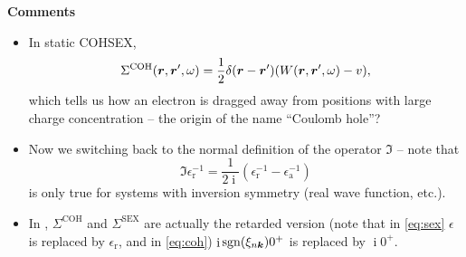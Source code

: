 \documentclass[t]{beamer}
\DeclareMathOperator{\ii}{i}
\DeclareMathOperator{\sgn}{sgn}
\begin{document}
\begin{frame}[allowframebreaks]
\textbf{Comments} \begin{itemize}
    \item In static COHSEX,  
        \begin{equation}
            \Sigma^{\text{COH}}(\vb*{r}, \vb*{r}', \omega)
            = \frac{1}{2} \delta(\vb*{r} - \vb*{r}') (W(\vb*{r}, \vb*{r}', \omega) - v),
        \end{equation}
        which tells us how an electron is dragged away 
        from positions with large charge concentration
        -- the origin of the name ``Coulomb hole''?
    \item Now we switching back to the normal definition of the operator $\Im$ -- 
        note that 
        \[
            \Im \epsilon_{\text{r}}^{-1} = \frac{1}{2\ii} (\epsilon^{-1}_{\text{r}} - \epsilon^{-1}_{\text{a}}) 
        \]
        is only true for systems with inversion symmetry 
        (real wave function, etc.).
    \item In \cite{berkeleygw}, $\Sigma^{\text{COH}}$ and $\Sigma^{\text{SEX}}$
        are actually the retarded version 
        (note that in \eqref{eq:sex} $\epsilon$ is replaced by $\epsilon_{\text{r}}$,
        and in \eqref{eq:coh}) $\ii \sgn(\xi_{n \vb*{k}}) 0^+$ is replaced by $\ii 0^+$.
\end{itemize}

\end{frame}
\end{document}
